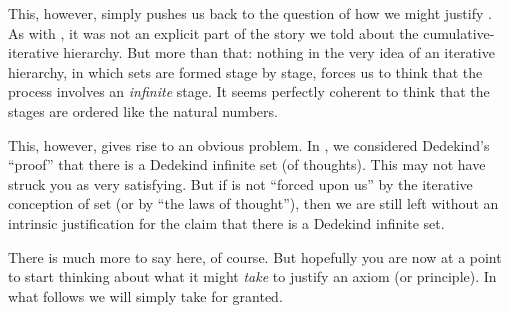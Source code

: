 \documentclass[../../../include/open-logic-section]{subfiles}
\begin{document}
This, however, simply pushes us back to the question of how we might justify \stagesinf. As with \stagessucc, it was not an explicit part of the story we told about the cumulative-iterative hierarchy. But more than that: nothing in the very idea of an iterative hierarchy, in which sets are formed stage by stage, forces us to think that the process involves an \emph{infinite} stage. It seems perfectly coherent to think that the stages are ordered like the natural numbers. 

This, however, gives rise to an obvious problem. In , we considered Dedekind's ``proof'' that there is a Dedekind infinite set (of thoughts). This may not have struck you as very satisfying. But if \stagesinf{} is not ``forced upon us'' by the iterative conception of set (or by ``the laws of thought''), then we are still left without an intrinsic justification for the claim that there is a Dedekind infinite set.

There is much more to say here, of course. But hopefully you are now at a point to start thinking about what it might \emph{take} to justify an axiom (or principle). In what follows we will simply take \stagesinf{} for granted.
\end{document}
